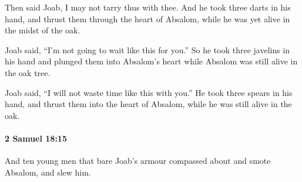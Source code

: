 			\begin{versebox}
					\item[BHS] 
					\item[ASV] Then said Joab, I may not tarry thus with thee. And he took three darts in his hand, and thrust them through the heart of Absalom, while he was yet alive in the midst of the oak.
					\item[NIV] Joab said, “I’m not going to wait like this for you.” So he took three javelins in his hand and plunged them into Absalom’s heart while Absalom was still alive in the oak tree.
					\item[NRSV] Joab said, “I will not waste time like this with you.” He took three spears in his hand, and thrust them into the heart of Absalom, while he was still alive in the oak.
			\end{versebox}

		\paragraph{2 Samuel 18:15} %
			\label{2SAMUEL-18-15}

			And ten young men that bare Joab’s armour compassed about and smote Absalom, and slew him.

